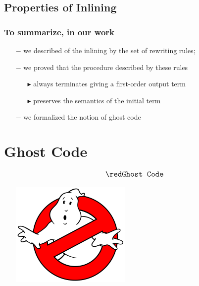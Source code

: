 \subsection*{Properties of Inlining}
\begin{frame}\frametitle{To summarize, in our work}\vspace*{-4em}
\begin{itemize}
	\item[\blue$-$]  we described of the inlining by the set of rewriting rules; \\[1em]
	\item[\blue$-$]  we proved that the procedure described by these rules \\[0.5em]
	
	\begin{itemize}
		\item[$\blacktriangleright$]
		{\normalsize always {\red terminates } giving a first-order output term} \\[0.3em]
		\item[$\blacktriangleright$]  
		{\normalsize {\red preserves} the semantics of the initial term} \\[1em]
	\end{itemize}
	\item[\blue $-$] we formalized the notion of {\red ghost code}
\end{itemize}
\end{frame}

\section*{Ghost Code}

\begin{frame}
 \begin{itemize}
 	\item[] $${\large \red \texttt{Ghost Code}}$$
 	\begin{center}
 	\includegraphics[scale=0.31]{GhostBusters}
 	\end{center} 
 \end{itemize}
\end{frame}
\addtocounter{framenumber}{-1}

